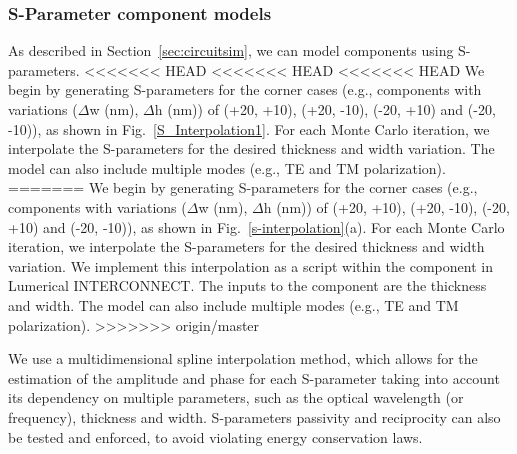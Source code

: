 \documentclass[journal]{spie}
\begin{document}
\subsubsection{S-Parameter component models}
\label{SparamModel}
As described in Section~\ref{sec:circuitsim}, we can model components using S-parameters.  
<<<<<<< HEAD
<<<<<<< HEAD
<<<<<<< HEAD
We begin by generating S-parameters for the corner cases (e.g., components with variations ($\Delta$w (nm), $\Delta$h (nm)) of (+20, +10), (+20, -10), (-20, +10) and (-20, -10)), as shown in Fig.~\ref{S_Interpolation1}.  For each Monte Carlo iteration, we interpolate the S-parameters for the desired thickness and width variation. The model can also include multiple modes (e.g., TE and TM polarization).
=======
We begin by generating S-parameters for the corner cases (e.g., components with variations ($\Delta$w (nm), $\Delta$h (nm)) of (+20, +10), (+20, -10), (-20, +10) and (-20, -10)), as shown in Fig.~\ref{s-interpolation}(a).  For each Monte Carlo iteration, we interpolate the S-parameters for the desired thickness and width variation.  We implement this interpolation as a script within the component in Lumerical INTERCONNECT.  The inputs to the component are the thickness and width.
The model can also include multiple modes (e.g., TE and TM polarization).
>>>>>>> origin/master

We use a multidimensional spline interpolation method, which allows for the estimation of the amplitude and phase for each S-parameter taking into account its dependency on multiple parameters, such as the optical wavelength (or frequency), thickness and width.  S-parameters passivity and reciprocity can also be tested and enforced, to avoid violating energy conservation laws.  
\end{document}
